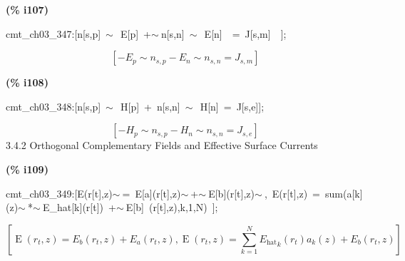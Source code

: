 \documentclass[fleqn]{article}
\begin{document}
\noindent
\begin{minipage}[t]{4.000000em}\color{red}\bfseries
(\% i107)	
\end{minipage}
\begin{minipage}[t]{\textwidth}\color{blue}
cmt\_ch03\_347:[n[s,p]\ \ensuremath{\sim\ }\ E[p]\ +\ensuremath{\sim\ }n[s,n]\ \ensuremath{\sim\ }\ E[n]\ \ =\ J[s,m]\ \ ];
\end{minipage}
\[\displaystyle \tag{cmt\_ ch03\_ 347} 
\left[ -{E_p}\operatorname{\sim  }{n_{s,p}}-{E_n}\operatorname{\sim  }{n_{s,n}}={J_{s,m}}\right] \mbox{}
\]


\noindent
\begin{minipage}[t]{4.000000em}\color{red}\bfseries
(\% i108)	
\end{minipage}
\begin{minipage}[t]{\textwidth}\color{blue}
cmt\_ch03\_348:[n[s,p]\ \ensuremath{\sim\ }\ H[p]\ +\ n[s,n]\ \ensuremath{\sim\ }\ H[n]\ =\ J[s,e]];
\end{minipage}
\[\displaystyle \tag{cmt\_ ch03\_ 348} 
\left[ -{H_p}\operatorname{\sim  }{n_{s,p}}-{H_n}\operatorname{\sim  }{n_{s,n}}={J_{s,e}}\right] \mbox{}
\]
3.4.2 Orthogonal Complementary Fields and Effective Surface Currents


\noindent
\begin{minipage}[t]{4.000000em}\color{red}\bfseries
(\% i109)	
\end{minipage}
\begin{minipage}[t]{\textwidth}\color{blue}
cmt\_ch03\_349:[E(r[t],z)\ensuremath{\sim\ }=\ E[a](r[t],z)\ensuremath{\sim\ }+\ensuremath{\sim\ }E[b](r[t],z)\ensuremath{\sim\ },\ E(r[t],z)\ =\ sum(a[k](z)\ensuremath{\sim\ }*\ensuremath{\sim\ }E\_hat[k](r[t])\ +\ensuremath{\sim\ }E[b]\ (r[t],z),k,1,N)\ ];
\end{minipage}
\[\displaystyle \tag{cmt\_ ch03\_ 349} 
\left[ \operatorname{E}\left( {r_t}\operatorname{,}z\right) ={E_b}\left( {r_t}\operatorname{,}z\right) +{E_a}\left( {r_t}\operatorname{,}z\right) \operatorname{,}\operatorname{E}\left( {r_t}\operatorname{,}z\right) =\sum_{k=1}^{N}{\left. {{{E_{\ensuremath{\mathrm{hat}}}}}_k}\left( {r_t}\right)  {a_k}(z)+{E_b}\left( {r_t}\operatorname{,}z\right) \right.}\right] \mbox{}
\]
\end{document}
